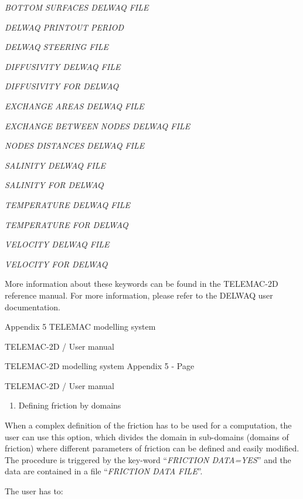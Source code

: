 \documentclass{article} %
\begin{document}
 \textit{BOTTOM SURFACES DELWAQ FILE}

 \textit{DELWAQ PRINTOUT PERIOD}

 \textit{DELWAQ STEERING FILE}

 \textit{DIFFUSIVITY DELWAQ FILE}

 \textit{DIFFUSIVITY FOR DELWAQ}

 \textit{EXCHANGE AREAS DELWAQ FILE}

 \textit{EXCHANGE BETWEEN NODES DELWAQ FILE}

 \textit{NODES DISTANCES DELWAQ FILE}

 \textit{SALINITY DELWAQ FILE}

 \textit{SALINITY FOR DELWAQ}

 \textit{TEMPERATURE DELWAQ FILE}

 \textit{TEMPERATURE FOR DELWAQ}

 \textit{VELOCITY DELWAQ FILE}

 \textit{VELOCITY FOR DELWAQ}

 More information about these keywords can be found in the TELEMAC-2D reference manual. For more information, please refer to the DELWAQ user documentation.











 Appendix 5 TELEMAC modelling system

 TELEMAC-2D / User manual



 TELEMAC-2D modelling system Appendix 5 - Page

 TELEMAC-2D / User manual





\begin{enumerate}
\item   Defining friction by domains
\end{enumerate}

 When a complex definition of the friction has to be used for a computation, the user can use this option, which divides the domain in sub-domains (domains of friction) where different parameters of friction can be defined and easily modified. The procedure is triggered by the key-word ``\textit{FRICTION DATA=YES}'' and the data are contained in a file ``\textit{FRICTION DATA FILE}''.

 The user has to:
\end{document}
